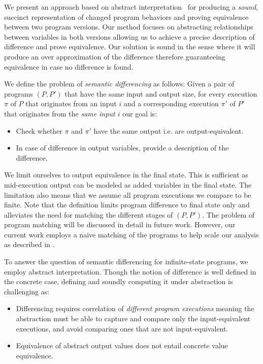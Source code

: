 We present an approach based on abstract interpretation~\cite{CousotCousot77} for producing a \emph{sound}, succinct representation of changed program behaviors and proving equivalence between two program versions. Our method focuses on abstracting relationships between variables in both versions allowing us to achieve a precise description of difference and prove equivalence. Our solution is sound in the sense where it will produce an over approximation of the difference therefore guaranteeing equivalence in case no difference is found.

We define the problem of \emph{semantic differencing} as follows: Given a pair of programs $(P,P')$ that have the same input and output size, for every execution $\pi$ of $P$ that originates from an input $i$ and a corresponding execution $\pi'$ of $P'$ that originates from the \emph{same input $i$} our goal is:
\begin{itemize}
\item Check whether $\pi$ and $\pi'$ have the same output i.e. are output-equivalent.
\item In case of difference in output variables, provide a description of the difference.
\end{itemize}
We limit ourselves to output equivalence in the final state. This is sufficient as mid-execution output can be modeled as added variables in the final state. The limitation also means that we assume all program executions we compare to be finite.
Note that the definition limits program difference to final state only and alleviates the need for matching the different stages of $(P,P')$. The problem of program matching will be discussed in detail in future work. However, our current work employs a naive matching of the programs to help scale our analysis as described in \secref{}.

To answer the question of semantic differencing for infinite-state programs, we employ abstract interpretation. Though the notion of difference is well defined in the concrete case, defining and soundly computing it under abstraction is challenging as:
\begin{itemize}
\item Differencing requires correlation of \emph{different program executions} meaning the abstraction must be able to capture and compare only the input-equivalent executions, and avoid comparing ones that are not input-equivalent.
\item Equivalence of abstract output values does not entail concrete value equivalence.
\end{itemize}

